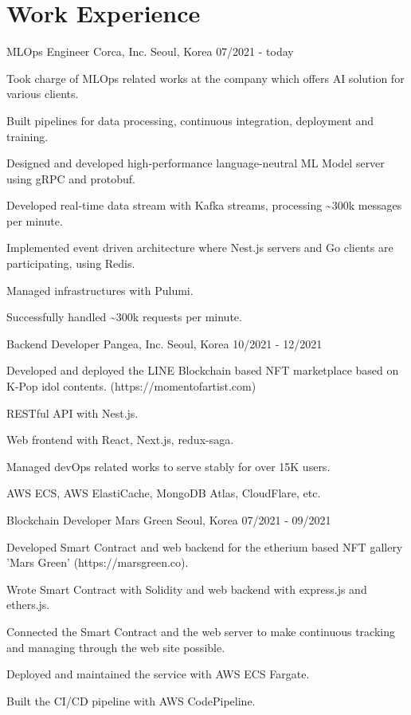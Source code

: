 \section{Work Experience}

\cventry
{MLOps Engineer} %
{Corca, Inc.} %
{Seoul, Korea} %
{07/2021 - today} %
\begin{cvitems}
\item {Took charge of MLOps related works at the company which offers AI solution for various clients.}
\item {Built pipelines for data processing, continuous integration, deployment and training.}
\item {Designed and developed high-performance language-neutral ML Model server using gRPC and protobuf.}
\item {Developed real-time data stream with Kafka streams, processing \textasciitilde 300k messages per minute.}
\item {Implemented event driven architecture where Nest.js servers and Go clients are participating, using Redis.}
\item {Managed infrastructures with Pulumi.}
\item {Successfully handled \textasciitilde 300k requests per minute.}
\end{cvitems}

\cventry
{Backend Developer} %
{Pangea, Inc.} %
{Seoul, Korea} %
{10/2021 - 12/2021} %
\begin{cvitems}
\item {Developed and deployed the LINE Blockchain based NFT marketplace based on K-Pop idol contents. (https://momentofartist.com)}
\item {RESTful API with Nest.js.}
\item {Web frontend with React, Next.js, redux-saga.}
\item {Managed devOps related works to serve stably for over 15K users.}
\item {AWS ECS, AWS ElastiCache, MongoDB Atlas, CloudFlare, etc.}
\end{cvitems}

\cventry
{Blockchain Developer} %
{Mars Green} %
{Seoul, Korea} %
{07/2021 - 09/2021} %
\begin{cvitems}
\item {Developed Smart Contract and web backend for the etherium based NFT gallery 'Mars Green' (https://marsgreen.co).}
\item {Wrote Smart Contract with Solidity and web backend with express.js and ethers.js.}
\item {Connected the Smart Contract and the web server to make continuous tracking and managing through the web site possible.}
\item {Deployed and maintained the service with AWS ECS Fargate.}
\item {Built the CI/CD pipeline with AWS CodePipeline.}
\end{cvitems}

